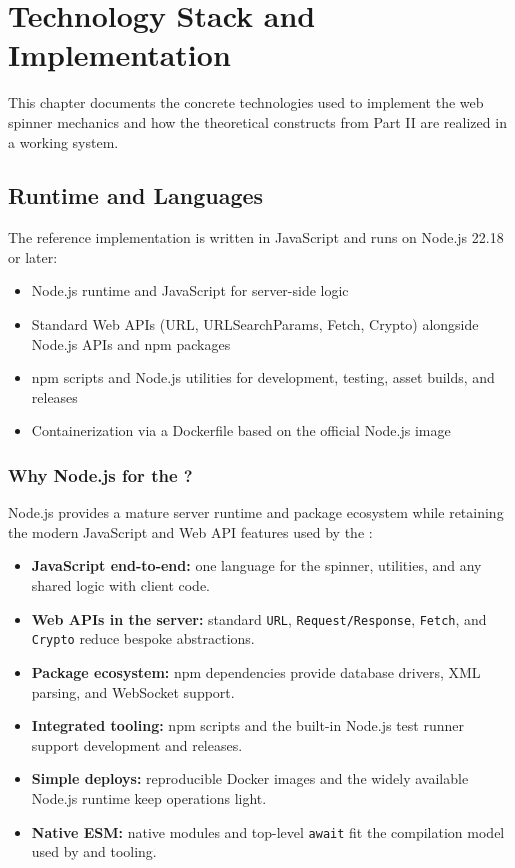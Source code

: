 \chapter{Technology Stack and Implementation}
\label{chap:technology}

This chapter documents the concrete technologies used to implement the web spinner mechanics and how the theoretical constructs from Part II are realized in a working system.

\section{Runtime and Languages}
The reference implementation is written in JavaScript and runs on Node.js 22.18 or later:
\begin{itemize}
	\item Node.js runtime and JavaScript for server-side logic
	\item Standard Web APIs (URL, URLSearchParams, Fetch, Crypto) alongside Node.js APIs and npm packages
	\item npm scripts and Node.js utilities for development, testing, asset builds, and releases
	\item Containerization via a Dockerfile based on the official Node.js image
\end{itemize}

\subsection{Why Node.js for the \webspinner?}
Node.js provides a mature server runtime and package ecosystem while retaining the modern JavaScript and Web API features used by the \webspinner:
\begin{itemize}
	\item \textbf{JavaScript end-to-end:} one language for the spinner, utilities, and any shared logic with client code.
	\item \textbf{Web APIs in the server:} standard \texttt{URL}, \texttt{Request/Response}, \texttt{Fetch}, and \texttt{Crypto} reduce bespoke abstractions.
	\item \textbf{Package ecosystem:} npm dependencies provide database drivers, XML parsing, and WebSocket support.
	\item \textbf{Integrated tooling:} npm scripts and the built-in Node.js test runner support development and releases.
	\item \textbf{Simple deploys:} reproducible Docker images and the widely available Node.js runtime keep operations light.
	\item \textbf{Native ESM:} native modules and top-level \texttt{await} fit the compilation model used by \wbll and \wbpl tooling.
\end{itemize}

